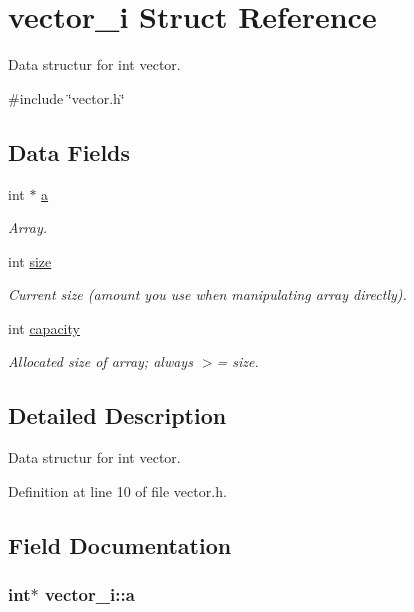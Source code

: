 \hypertarget{structvector__i}{
\section{vector\_\-i Struct Reference}
\label{structvector__i}
}


Data structur for int vector.  




{\ttfamily \#include \char`\"{}vector.h\char`\"{}}

\subsection*{Data Fields}
\begin{DoxyCompactItemize}
\item 
int $\ast$ \hyperlink{structvector__i_a1f7c0e586cb1e09323dec3dd48d13882}{a}
\begin{DoxyCompactList}\small\item\em Array. \item\end{DoxyCompactList}\item 
int \hyperlink{structvector__i_a04afc9e861d169d920fc8d2a26b670cd}{size}
\begin{DoxyCompactList}\small\item\em Current size (amount you use when manipulating array directly). \item\end{DoxyCompactList}\item 
int \hyperlink{structvector__i_af108aa670ac888975024a428c31f27fc}{capacity}
\begin{DoxyCompactList}\small\item\em Allocated size of array; always $>$= size. \item\end{DoxyCompactList}\end{DoxyCompactItemize}


\subsection{Detailed Description}
Data structur for int vector. 

Definition at line 10 of file vector.h.



\subsection{Field Documentation}
\hypertarget{structvector__i_a1f7c0e586cb1e09323dec3dd48d13882}{
\subsubsection[{a}]{\setlength{\rightskip}{0pt plus 5cm}int$\ast$ {\bf vector\_\-i::a}}}
\label{structvector__i_a1f7c0e586cb1e09323dec3dd48d13882}


